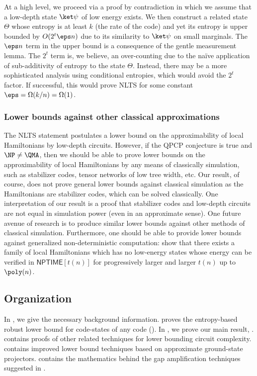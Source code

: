 \documentclass{toc}
\begin{document}
At a high level, we proceed via a %
proof by contradiction   %
in which we assume that a low-depth state $\ket \psi$ of %
low energy  %
exists. We then construct a related state $\Theta$ whose entropy is at least $k$ (the rate of the code) and yet its entropy is upper bounded by $O(2^t \eps n)$ due to its similarity to $\ket \psi$ on small marginals. The $\eps n$ term in the upper bound is a consequence of the gentle measurement lemma. 
The $2^t$ term is, we believe, an over-counting due to the na\"ive application of sub-additivity of entropy to the state $\Theta$. Instead, there may be a more sophisticated analysis using conditional entropies, which would avoid the $2^t$ factor. If successful, this would prove NLTS for some constant $\eps = \Omega(k/n) = \Omega(1)$.

\subsubsection{Lower bounds against other classical approximations}

The NLTS statement postulates a lower bound on the approximability of local Hamiltonians by
low-depth circuits. %
However, if the QPCP conjecture is true and $\NP \neq \QMA$, then we should be able to prove lower bounds on the approximability of local Hamiltonians by any means of classically simulation, such as stabilizer codes, tensor networks of low tree width, etc. Our result, of course, does not prove general lower bounds against classical simulation as the Hamiltonians are stabilizer codes, which can be solved classically. One interpretation of our result is a proof that stabilizer codes and low-depth circuits
%
are not equal in simulation power (even in an approximate sense). One future avenue of research is to produce similar lower bounds against other methods of classical simulation. Furthermore, one should be able to provide lower bounds against generalized non-deterministic computation: show that there exists a family of local Hamiltonians which has no low-energy states whose energy can be verified in $\textsf{NPTIME}[t(n)]$ for progressively larger and larger $t(n)$ up to $\poly(n)$.

%
\subsection{Organization}
In , we give the necessary background information.  proves the entropy-based robust lower bound for code-states of any code (). In , we prove our main result, .  contains proofs of other related techniques for lower bounding circuit complexity.  contains improved lower bound techniques based on approximate ground-state projectors.  contains the mathematics behind the gap amplification techniques suggested in .
\end{document}
